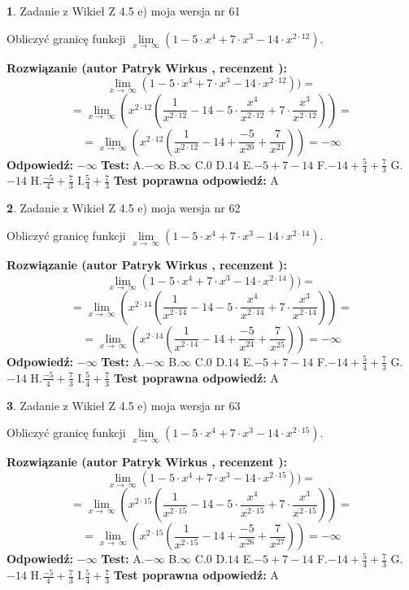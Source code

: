 \documentclass[12pt, a4paper]{article}
\theoremstyle{definition} %
\newtheorem{zad}{}
\newcommand{\zadStart}[1]{\begin{zad}#1\newline}
\newcommand{\zadStop}{\end{zad}}
\newcommand{\rozwStart}[2]{\noindent \textbf{Rozwiązanie (autor #1 , recenzent #2): }\newline}
\newcommand{\rozwStop}{\newline}
\newcommand{\odpStart}{\noindent \textbf{Odpowiedź:}\newline}
\newcommand{\odpStop}{\newline}
\newcommand{\testStart}{\noindent \textbf{Test:}\newline}
\newcommand{\testStop}{\newline}
\newcommand{\kluczStart}{\noindent \textbf{Test poprawna odpowiedź:}\newline}
\newcommand{\kluczStop}{\newline}
\begin{document}
\zadStart{Zadanie z Wikieł Z 4.5 e) moja wersja nr 61}



Obliczyć granicę funkcji  $\lim\limits_{x\to\ \infty}(1 - 5 \cdot x^{4}+7 \cdot x^{3}- 14 \cdot x^{2\cdot12})$.
\zadStop
\rozwStart{Patryk Wirkus}{}
$$\lim\limits_{x\to\ \infty}(1 - 5 \cdot x^{4}+7 \cdot x^{3}- 14 \cdot x^{2\cdot12}))=$$
$$=\lim\limits_{x\to\ \infty}(x^{2\cdot12}(\frac{1}{x^{2\cdot12}}-14 -5 \cdot \frac{x^{4}}{x^{2\cdot12}}+7 \cdot \frac{x^{3}}{x^{2\cdot12}}))=$$
$$=\lim\limits_{x\to\ \infty}(x^{2\cdot12}(\frac{1}{x^{2\cdot12}}-14 + \frac{-5}{x^{20}}+ \frac{7}{x^{21}}))=-\infty$$
\rozwStop
\odpStart
$-\infty$
\odpStop
\testStart
A.$-\infty$ B.$\infty$ C.$0$ D.$14$ E.$-5 + 7 - 14$
F.$-14+\frac{5}{4}+\frac{7}{3}$ G.$-14$
H.$\frac{-5}{4}+\frac{7}{3}$
I.$\frac{5}{4}+\frac{7}{3}$
\testStop
\kluczStart
A
\kluczStop



\zadStart{Zadanie z Wikieł Z 4.5 e) moja wersja nr 62}



Obliczyć granicę funkcji  $\lim\limits_{x\to\ \infty}(1 - 5 \cdot x^{4}+7 \cdot x^{3}- 14 \cdot x^{2\cdot14})$.
\zadStop
\rozwStart{Patryk Wirkus}{}
$$\lim\limits_{x\to\ \infty}(1 - 5 \cdot x^{4}+7 \cdot x^{3}- 14 \cdot x^{2\cdot14}))=$$
$$=\lim\limits_{x\to\ \infty}(x^{2\cdot14}(\frac{1}{x^{2\cdot14}}-14 -5 \cdot \frac{x^{4}}{x^{2\cdot14}}+7 \cdot \frac{x^{3}}{x^{2\cdot14}}))=$$
$$=\lim\limits_{x\to\ \infty}(x^{2\cdot14}(\frac{1}{x^{2\cdot14}}-14 + \frac{-5}{x^{24}}+ \frac{7}{x^{25}}))=-\infty$$
\rozwStop
\odpStart
$-\infty$
\odpStop
\testStart
A.$-\infty$ B.$\infty$ C.$0$ D.$14$ E.$-5 + 7 - 14$
F.$-14+\frac{5}{4}+\frac{7}{3}$ G.$-14$
H.$\frac{-5}{4}+\frac{7}{3}$
I.$\frac{5}{4}+\frac{7}{3}$
\testStop
\kluczStart
A
\kluczStop



\zadStart{Zadanie z Wikieł Z 4.5 e) moja wersja nr 63}



Obliczyć granicę funkcji  $\lim\limits_{x\to\ \infty}(1 - 5 \cdot x^{4}+7 \cdot x^{3}- 14 \cdot x^{2\cdot15})$.
\zadStop
\rozwStart{Patryk Wirkus}{}
$$\lim\limits_{x\to\ \infty}(1 - 5 \cdot x^{4}+7 \cdot x^{3}- 14 \cdot x^{2\cdot15}))=$$
$$=\lim\limits_{x\to\ \infty}(x^{2\cdot15}(\frac{1}{x^{2\cdot15}}-14 -5 \cdot \frac{x^{4}}{x^{2\cdot15}}+7 \cdot \frac{x^{3}}{x^{2\cdot15}}))=$$
$$=\lim\limits_{x\to\ \infty}(x^{2\cdot15}(\frac{1}{x^{2\cdot15}}-14 + \frac{-5}{x^{26}}+ \frac{7}{x^{27}}))=-\infty$$
\rozwStop
\odpStart
$-\infty$
\odpStop
\testStart
A.$-\infty$ B.$\infty$ C.$0$ D.$14$ E.$-5 + 7 - 14$
F.$-14+\frac{5}{4}+\frac{7}{3}$ G.$-14$
H.$\frac{-5}{4}+\frac{7}{3}$
I.$\frac{5}{4}+\frac{7}{3}$
\testStop
\kluczStart
A
\kluczStop
\end{document}
